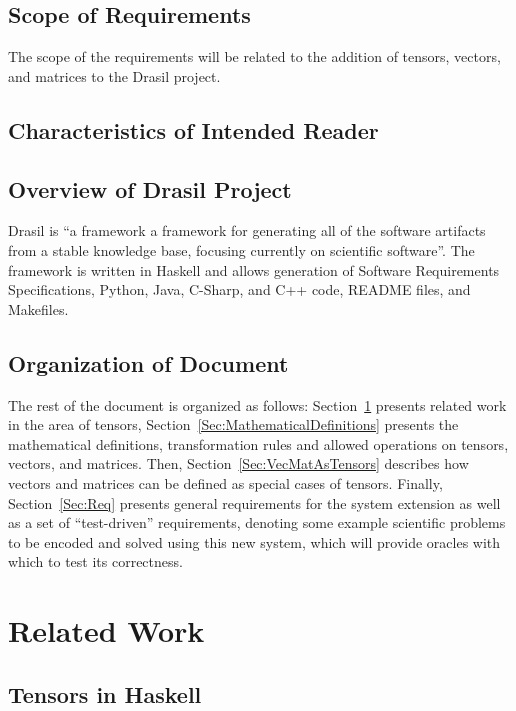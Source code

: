 \documentclass[12pt]{article}
\begin{document}
\subsection{Scope of Requirements} 
The scope of the requirements will be related to the addition of tensors, vectors,
and matrices to the Drasil project.

\subsection{Characteristics of Intended Reader}\label{sec_IntendedReader}

\subsection{Overview of Drasil Project}
Drasil is ``a framework a framework for generating all of the software artifacts from 
a stable knowledge base, focusing currently on scientific software''. The framework
is written in Haskell and allows generation of Software Requirements Specifications,
Python, Java, C-Sharp, and C++ code, README files, and Makefiles.

\subsection{Organization of Document}
The rest of the document is organized as follows: Section~\ref{Sec:RelatedWork} 
presents related work in the area of tensors, Section~\ref{Sec:MathematicalDefinitions}
presents the mathematical definitions, transformation rules and allowed operations
on tensors, vectors, and matrices. Then, Section~\ref{Sec:VecMatAsTensors} describes
how vectors and matrices can be defined as special cases of tensors. Finally, 
Section~\ref{Sec:Req} presents general requirements for the system extension as well as
a set of ``test-driven'' requirements, denoting some example scientific problems
to be encoded and solved using this new system, which will provide oracles with which
to test its correctness.


\section{Related Work}\label{Sec:RelatedWork}

\subsection{Tensors in Haskell}
\end{document}
